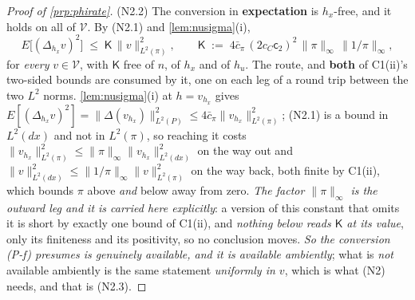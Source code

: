 \begin{proof}[Proof of \cref{prp:phirate}]
(N2.2) The conversion in \textbf{expectation} is $h_x$-free, and it holds on all of $\mathcal V$.
By (N2.1) and \cref{lem:nusigma}(i),
\begin{equation}\label{eq:convmean}
E\big[(\Delta_{h_x}v)^{2}\big]\;\le\;\mathsf K\,\|v\|^{2}_{L^{2}(\pi)},
\qquad
\mathsf K\;:=\;4\bar c_\pi\,(2c_C\mathsf c_2)^{2}\,\|\pi\|_\infty\,\|1/\pi\|_\infty ,
\end{equation}
for \emph{every} $v\in\mathcal V$, with $\mathsf K$ free of $n$, of $h_x$ and of $h_u$.
The route, and \textbf{both} of C1(ii)'s two-sided bounds are consumed by it, one on each leg of a
round trip between the two $L^{2}$ norms. \cref{lem:nusigma}(i) at $h=v_{h_x}$ gives
$E[(\Delta_{h_x}v)^{2}]=\|\Delta(v_{h_x})\|^{2}_{L^{2}(P)}\le4\bar c_\pi\|v_{h_x}\|^{2}_{L^{2}(\pi)}$;
(N2.1) is a bound in $L^{2}(dx)$ and not in $L^{2}(\pi)$, so reaching it costs
$\|v_{h_x}\|^{2}_{L^{2}(\pi)}\le\|\pi\|_\infty\|v_{h_x}\|^{2}_{L^{2}(dx)}$ on the way out and
$\|v\|^{2}_{L^{2}(dx)}\le\|1/\pi\|_\infty\|v\|^{2}_{L^{2}(\pi)}$ on the way back, both finite by C1(ii),
which bounds $\pi$ above \emph{and} below away from zero. \emph{The factor $\|\pi\|_\infty$ is the
outward leg and it is carried here explicitly}: a version of this constant that omits it is short by
exactly one bound of C1(ii), and \emph{nothing below reads $\mathsf K$ at its value}, only its
finiteness and its positivity, so no conclusion moves.
\emph{So the
conversion (P-f) presumes is genuinely available, and it is available ambiently}; what is \emph{not}
available ambiently is the same statement \emph{uniformly in $v$}, which is what (N2) needs, and that is
(N2.3).


\end{proof}

